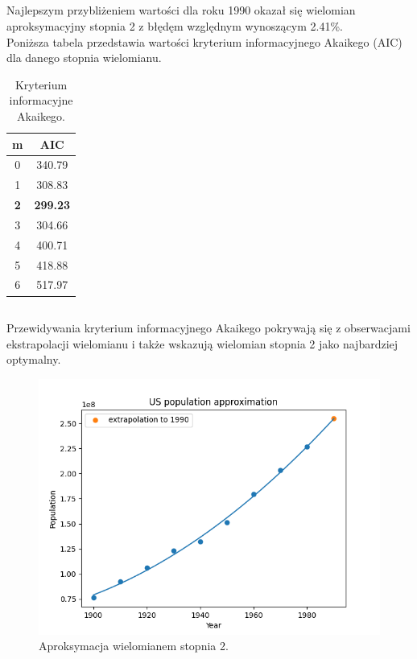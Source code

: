 \documentclass[11pt]{scrartcl}
\begin{document}
    \subsection*{}
    Najlepszym przybliżeniem wartości dla roku 1990 okazał się wielomian
    aproksymacyjny stopnia 2 z błędęm względnym wynoszącym 2.41\%. \\
    Poniższa tabela przedstawia wartości kryterium informacyjnego Akaikego
    (AIC) dla danego stopnia wielomianu.

    \begin{table}[H]
        \centering
        \renewcommand{\arraystretch}{1.5}
        \begin{tabular}{|c|c|}
            \hline
            \textbf{m} & \textbf{AIC} \\
            \hline
            0 & 340.79 \\
            \hline
            1 & 308.83 \\
            \hline
            \textbf{2} & \textbf{299.23} \\
            \hline
            3 & 304.66 \\
            \hline
            4 & 400.71 \\
            \hline
            5 & 418.88 \\
            \hline
            6 & 517.97 \\
            \hline
        \end{tabular}
        \caption{Kryterium informacyjne Akaikego.}
    \end{table}
    
    \subsection*{}
    Przewidywania kryterium informacyjnego Akaikego pokrywają się
    z obserwacjami ekstrapolacji wielomianu i także wskazują wielomian
    stopnia 2 jako najbardziej optymalny.

    \begin{figure}[H]
        \centering
        \includegraphics[width=0.8\linewidth]{approx1.png}
        \caption{Aproksymacja wielomianem stopnia 2.}
    \end{figure}
\end{document}
